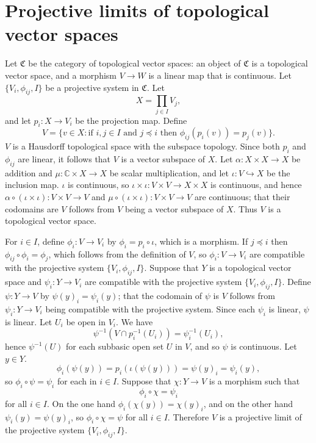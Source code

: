 \documentclass{article}
\begin{document}
\section{Projective limits of topological vector spaces}
Let $\mathfrak{C}$ be the category of topological vector spaces: an object of $\mathfrak{C}$ is a topological vector space, and a morphism $V \to W$ is a linear map that is continuous. 
Let $\{V_i,\phi_{ij},I\}$ be a projective system in $\mathfrak{C}$. 
Let
\[
X= \prod_{j \in I} V_j,
\]
and 
let $p_i: X \to V_i$ be the projection map.
Define
\[
V=\Big\{v \in X: \textrm{if $i,j \in I$ and $j \preceq i$ then $\phi_{ij}(p_i(v))=p_j(v)$}   \Big\}.
\]
$V$ is a Hausdorff topological space with the subspace topology. Since both $p_i$ and $\phi_{ij}$ are linear, it follows that $V$ is a vector subspace of $X$. 
Let $\alpha:X \times X \to X$ be addition and
$\mu:\mathbb{C} \times X \to X$ be scalar multiplication,
and let $\iota: V \hookrightarrow X$ be the inclusion map. $\iota$  is continuous, so
$\iota \times \iota:V \times V \to  X \times X$
is continuous, and hence $\alpha \circ (\iota \times \iota):V \times V \to V$ 
and $\mu \circ (\iota \times \iota):V \times V \to V$ are continuous; that their codomains are $V$ follows from $V$ being a vector subspace of $X$. Thus $V$ is a topological vector space. 

For $i \in I$, define $\phi_i:V \to V_i$ by $\phi_i=p_i \circ \iota$, which is a morphism. 
If $j \preceq i$ then $\phi_{ij} \circ \phi_i=\phi_j$, which follows from the definition of $V$, so
$\phi_i:V \to V_i$ are compatible with the projective
system $\{V_i,\phi_{ij},I\}$.
Suppose that $Y$ is a topological vector space and $\psi_i:Y \to V_i$ are compatible with the projective system  $\{V_i,\phi_{ij},I\}$. Define 
$\psi:Y \to V$ by $\psi(y)_i=\psi_i(y)$; that the codomain of $\psi$ is $V$ follows from $\psi_i:Y \to V_i$ being compatible with the projective
system. Since each $\psi_i$ is linear, $\psi$ is linear. Let $U_i$ be open in $V_i$. We have
\[
\psi^{-1}(V \cap p_i^{-1}(U_i))=\psi_i^{-1}(U_i),
\]
hence $\psi^{-1}(U)$ for each subbasic open set $U$ in $V$, and so $\psi$ is continuous. Let $y \in Y$.
\[
\phi_i(\psi(y))=p_i (\iota ( \psi(y)))=\psi(y)_i=\psi_i(y),
\]
so $\phi_i \circ \psi = \psi_i$ for each in $i \in I$. 
Suppose that $\chi:Y \to V$ is a morphism such that 
\[
\phi_i \circ \chi=\psi_i
\]
for all $i \in I$. On the one hand $\phi_i(\chi(y))=\chi(y)_i$, and on the other hand $\psi_i(y)=\psi(y)_i$, so
$\phi_i \circ \chi = \psi$ for all $i \in I$. Therefore $V$ is a projective limit of the projective system
 $\{V_i,\phi_{ij},I\}$.
 
\end{document}
